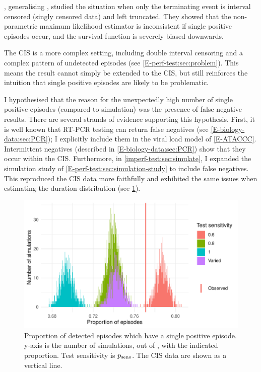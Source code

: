 \documentclass[thesis.tex]{subfiles}
\begin{document}
\Textcite{shenNonparametrica}, generalising \textcite{panNote}, studied the situation when only the terminating event is interval censored (\ie singly censored data) and left truncated.
They showed that the non-parametric maximum likelihood estimator is inconsistent if single positive episodes occur, and the survival function is severely biased downwards.

The CIS is a more complex setting, including double interval censoring and a complex pattern of undetected episodes (see \cref{E-perf-test:sec:problem}).
This means the result cannot simply be extended to the CIS, but still reinforces the intuition that single positive episodes are likely to be problematic.

I hypothesised that the reason for the unexpectedly high number of single positive episodes (compared to simulation) was the presence of false negative results.
There are several strands of evidence supporting this hypothesis.
First, it is well known that RT-PCR testing can return false negatives  (see \cref{E-biology-data:sec:PCR}); I explicitly include them in the viral load model of \cref{E-ATACCC}.
Intermittent negatives (described in  \cref{E-biology-data:sec:PCR}) show that they occur within the CIS.
Furthermore, in \cref{imperf-test:sec:simulate}, I expanded the simulation study of \cref{E-perf-test:sec:simulation-study} to include false negatives.
This reproduced the CIS data more faithfully and exhibited the same issues when estimating the duration distribution (see \cref{imperf-test:fig:sim-single-pos}).
\begin{figure}
  \centering \includegraphics{cis-imperfect-testing/sim-single-positive-episodes}
  \caption[Single positive episodes in CIS simulation]{%
    Proportion of detected episodes which have a single positive episode.
    y-axis is the number of simulations, out of , with the indicated proportion.
    Test sensitivity is $p_\text{sens}$.
    The CIS data are shown as a vertical line.
  }
  \label{imperf-test:fig:sim-single-pos}
\end{figure}
\end{document}
